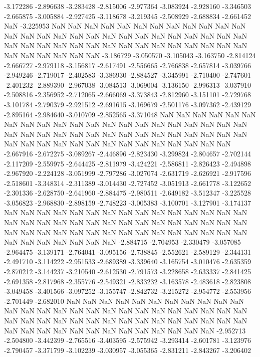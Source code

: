 -3.172286
-2.896638
-3.283428
-2.815006
-2.977364
-3.083924
-2.928160
-3.346503
-2.665875
-3.005884
-2.927425
-3.118678
-3.219345
-2.508929
-2.688834
-2.661452
NaN
-3.225953
NaN
NaN
NaN
NaN
NaN
NaN
NaN
NaN
NaN
NaN
NaN
NaN
NaN
NaN
NaN
NaN
NaN
NaN
NaN
NaN
NaN
NaN
NaN
NaN
NaN
NaN
NaN
NaN
NaN
NaN
NaN
NaN
NaN
NaN
NaN
NaN
NaN
NaN
NaN
NaN
NaN
NaN
NaN
NaN
NaN
NaN
NaN
NaN
-3.186729
-3.050570
-3.105043
-3.163750
-2.814124
-2.666727
-2.979118
-3.156817
-2.617491
-2.556665
-2.766838
-2.657814
-3.039766
-2.949246
-2.719017
-2.402583
-3.386930
-2.884527
-3.345991
-2.710400
-2.747601
-2.401232
-2.889390
-2.967038
-3.084513
-3.069004
-3.136150
-2.996313
-3.037910
-2.508816
-2.356952
-2.712065
-2.666069
-3.373843
-2.812960
-3.151101
-2.729768
-3.101784
-2.790379
-2.921512
-2.691615
-3.169679
-2.501176
-3.097362
-2.439129
-2.895164
-2.984640
-3.010709
-2.852565
-3.371048
NaN
NaN
NaN
NaN
NaN
NaN
NaN
NaN
NaN
NaN
NaN
NaN
NaN
NaN
NaN
NaN
NaN
NaN
NaN
NaN
NaN
NaN
NaN
NaN
NaN
NaN
NaN
NaN
NaN
NaN
NaN
NaN
NaN
NaN
NaN
NaN
NaN
NaN
NaN
NaN
NaN
NaN
NaN
NaN
NaN
NaN
NaN
NaN
NaN
NaN
-2.667916
-2.672275
-3.089267
-2.446896
-2.823430
-3.299824
-2.804657
-2.702144
-2.117209
-2.559975
-2.644425
-2.811979
-3.424221
-2.586811
-2.826423
-2.494898
-2.967920
-2.224128
-3.051999
-2.797286
-3.027074
-2.631719
-2.626921
-2.917596
-2.518601
-3.348314
-2.311389
-3.014430
-2.727452
-3.051913
-2.661778
-3.122652
-2.301336
-2.628750
-2.641960
-2.884475
-2.980511
-2.649182
-3.512347
-3.225528
-3.056823
-2.968830
-2.898159
-2.748223
-3.005383
-3.100701
-3.127901
-3.174137
NaN
NaN
NaN
NaN
NaN
NaN
NaN
NaN
NaN
NaN
NaN
NaN
NaN
NaN
NaN
NaN
NaN
NaN
NaN
NaN
NaN
NaN
NaN
NaN
NaN
NaN
NaN
NaN
NaN
NaN
NaN
NaN
NaN
NaN
NaN
NaN
NaN
NaN
NaN
NaN
NaN
NaN
NaN
NaN
NaN
NaN
NaN
NaN
NaN
NaN
NaN
NaN
-2.884715
-2.704953
-2.330479
-3.057085
-2.964475
-3.139171
-2.764041
-3.095156
-2.738845
-2.552621
-2.589129
-2.344131
-2.491710
-3.114222
-2.951533
-2.689389
-3.339640
-3.165754
-3.010476
-2.635359
-2.870212
-3.144237
-3.210540
-2.612530
-2.791573
-3.228658
-2.633337
-2.841425
-2.691358
-2.817968
-2.355776
-2.549321
-2.833232
-3.163578
-2.483618
-2.823808
-3.049458
-3.401566
-3.097252
-3.155747
-2.842732
-3.215272
-2.954772
-2.553956
-2.701449
-2.682010
NaN
NaN
NaN
NaN
NaN
NaN
NaN
NaN
NaN
NaN
NaN
NaN
NaN
NaN
NaN
NaN
NaN
NaN
NaN
NaN
NaN
NaN
NaN
NaN
NaN
NaN
NaN
NaN
NaN
NaN
NaN
NaN
NaN
NaN
NaN
NaN
NaN
NaN
NaN
NaN
NaN
NaN
NaN
NaN
NaN
NaN
NaN
NaN
NaN
NaN
NaN
NaN
NaN
NaN
-2.952713
-2.504800
-3.442399
-2.765516
-3.403595
-2.575942
-3.293414
-2.601781
-3.123976
-2.790457
-3.371799
-3.102239
-3.030957
-3.055365
-2.831211
-2.843267
-3.206402
